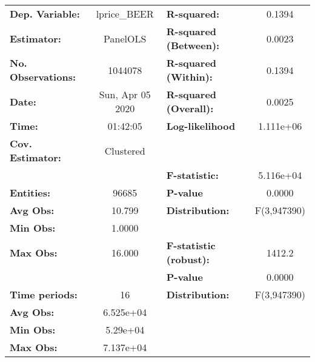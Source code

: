 \documentclass{report}a
\begin{document}
\begin{center}
\begin{tabular}{lclc}
\toprule
\textbf{Dep. Variable:}       &    lprice\_BEER    & \textbf{  R-squared:         }   &      0.1394      \\
\textbf{Estimator:}           &      PanelOLS      & \textbf{  R-squared (Between):}  &      0.0023      \\
\textbf{No. Observations:}    &      1044078       & \textbf{  R-squared (Within):}   &      0.1394      \\
\textbf{Date:}                &  Sun, Apr 05 2020  & \textbf{  R-squared (Overall):}  &      0.0025      \\
\textbf{Time:}                &      01:42:05      & \textbf{  Log-likelihood     }   &    1.111e+06     \\
\textbf{Cov. Estimator:}      &     Clustered      & \textbf{                     }   &                  \\
\textbf{}                     &                    & \textbf{  F-statistic:       }   &    5.116e+04     \\
\textbf{Entities:}            &       96685        & \textbf{  P-value            }   &      0.0000      \\
\textbf{Avg Obs:}             &       10.799       & \textbf{  Distribution:      }   &   F(3,947390)    \\
\textbf{Min Obs:}             &       1.0000       & \textbf{                     }   &                  \\
\textbf{Max Obs:}             &       16.000       & \textbf{  F-statistic (robust):} &      1412.2      \\
\textbf{}                     &                    & \textbf{  P-value            }   &      0.0000      \\
\textbf{Time periods:}        &         16         & \textbf{  Distribution:      }   &   F(3,947390)    \\
\textbf{Avg Obs:}             &     6.525e+04      & \textbf{                     }   &                  \\
\textbf{Min Obs:}             &      5.29e+04      & \textbf{                     }   &                  \\
\textbf{Max Obs:}             &     7.137e+04      & \textbf{                     }   &                  \\
\bottomrule
\end{tabular}
\begin{tabular}{lcccccc}

\end{tabular}
\end{center}
\end{document}
